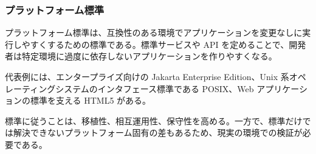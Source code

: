 \subsubsection{プラットフォーム標準}

プラットフォーム標準は、互換性のある環境でアプリケーションを変更なしに実行しやすくするための標準である。標準サービスや API を定めることで、開発者は特定環境に過度に依存しないアプリケーションを作りやすくなる。

代表例には、エンタープライズ向けの Jakarta Enterprise Edition、Unix 系オペレーティングシステムのインタフェース標準である POSIX、Web アプリケーションの標準を支える HTML5 がある。

標準に従うことは、移植性、相互運用性、保守性を高める。一方で、標準だけでは解決できないプラットフォーム固有の差もあるため、現実の環境での検証が必要である。
